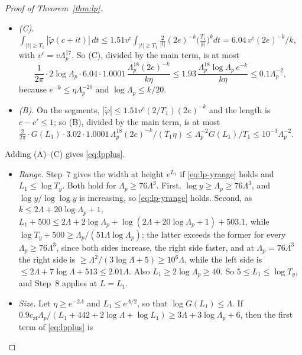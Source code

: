 \begin{proof}[Proof of Theorem~\ref{thm:lp}]
\begin{itemize}
\[    \exp\Big(-\frac{0.9\,c_{\mathrm{zf}}\Lambda_p}{L_1+442+2\log\Lambda+\log L_1}\Big),
  \]
  which is at most the first term of \eqref{eq:lpplus}, since $0.2404(14.33+8\log\Lambda_p+4\log k)\le18\Lambda_p^2$.
\item \emph{(C).} $\int_{|t|\ge T_1}|\tilde\varphi(c+it)|\,dt\le1.51v^c\int_{|t|\ge T_1}\frac2{|t|}(2e)^{-k}\Big(\frac{T_1}{|t|}\Big)^kdt
  =6.04\,v^c(2e)^{-k}/k$, with $v^c=v\Lambda_p^{17}$. So (C), divided by the main term, is at most
  \[
    \frac1{2\pi}\cdot2\log\Lambda_p\cdot6.04\cdot1.0001\,\frac{\Lambda_p^{18}(2e)^{-k}}{k\eta}\le1.93\,\frac{\Lambda_p^{18}\log\Lambda_p\,e^{-k}}{k\eta}
    \le0.1\Lambda_p^{-2},
  \]
  because $e^{-k}\le\eta\Lambda_p^{-20}$ and $\log\Lambda_p\le k/20$.
\item \emph{(B).} On the segments, $|\tilde\varphi|\le1.51v^c(2/T_1)(2e)^{-k}$ and the length is $c-c'\le1$; so (B), divided by
  the main term, is at most $\frac2{2\pi}\cdot G(L_1)\cdot3.02\cdot1.0001\,\Lambda_p^{18}(2e)^{-k}/(T_1\eta)\le\Lambda_p^{-2}G(L_1)/T_1
  \le10^{-3}\Lambda_p^{-2}$.
\end{itemize}
Adding (A)--(C) gives \eqref{eq:lpplus}.
\begin{itemize}
\item \emph{Range.} Step~7 gives the width at height $e^{L_1}$ if \eqref{eq:lp-yrange} holds and $L_1\le\log T_y$. Both hold for
  $\Lambda_p\ge76\Lambda^3$. First, $\log y\ge\Lambda_p\ge76\Lambda^3$, and $\log y/\log\log y$ is increasing, so
  \eqref{eq:lp-yrange} holds. Second, as $k\le2\Lambda+20\log\Lambda_p+1$,
  $L_1+500\le2\Lambda+2\log\Lambda_p+\log(2\Lambda+20\log\Lambda_p+1)+503.1$, while
  $\log T_y+500\ge\Lambda_p/(51\Lambda\log\Lambda_p)$; the latter exceeds the former for every $\Lambda_p\ge76\Lambda^3$, since both
  sides increase, the right side faster, and at $\Lambda_p=76\Lambda^3$ the right side is $\ge\Lambda^2/(3\log\Lambda+5)\ge10^6\Lambda$,
  while the left side is $\le2\Lambda+7\log\Lambda+513\le2.01\Lambda$.
  Also $L_1\ge2\log\Lambda_p\ge40$. So $5\le L_1\le\log T_y$, and Step~8 applies at $L=L_1$.
\item \emph{Size.} Let $\eta\ge e^{-2\Lambda}$ and $L_1\le e^{\Lambda/2}$, so that $\log G(L_1)\le\Lambda$. If
  $0.9c_{\mathrm{zf}}\Lambda_p/(L_1+442+2\log\Lambda+\log L_1)\ge3\Lambda+3\log\Lambda_p+6$, then the first term of \eqref{eq:lpplus} is

\end{itemize}
\end{proof}
